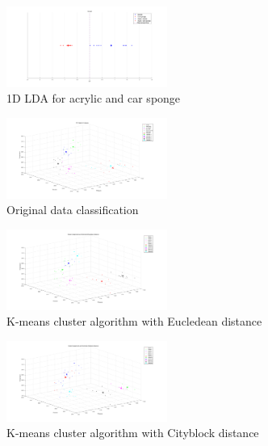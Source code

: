 \documentclass[10pt,twocolumn,letterpaper]{article}
\begin{document}
\begin{figure}[h]
\begin{center}
   \includegraphics[width=0.47\textwidth]{sec3_part1d_6}
\end{center}
   \caption{1D LDA for acrylic and car sponge}
\label{fig:28}
\end{figure}


\begin{figure}[h]
\begin{center}
   \includegraphics[width=0.47\textwidth]{sec4_part1a_1}
\end{center}
   \caption{Original data classification}
\label{fig:29}
\end{figure}

\begin{figure}[h]
\begin{center}
   \includegraphics[width=0.47\textwidth]{sec4_part1a_2}
\end{center}
   \caption{K-means cluster algorithm with Eucledean distance}
\label{fig:30}
\end{figure}

\begin{figure}[h]
\begin{center}
   \includegraphics[width=0.47\textwidth]{sec4_part1c}
\end{center}
   \caption{K-means cluster algorithm with Cityblock distance}
\label{fig:31}
\end{figure}
\end{document}
